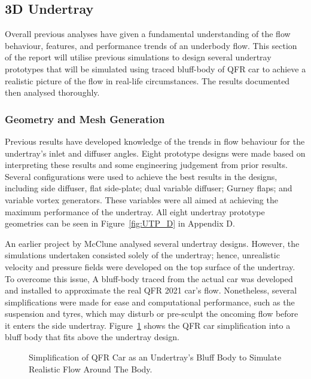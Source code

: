 
\subsection{3D Undertray}
Overall previous analyses have given a fundamental understanding of the flow behaviour, features, and performance trends of an underbody flow. This section of the report will utilise previous simulations to design several undertray prototypes that will be simulated using traced bluff-body of QFR car to achieve a realistic picture of the flow in real-life circumstances. The results documented then analysed thoroughly.

\subsubsection{Geometry and Mesh Generation}
\noindent Previous results have developed knowledge of the trends in flow behaviour for the undertray's inlet and diffuser angles. Eight prototype designs were made based on interpreting these results and some engineering judgement from prior results. Several configurations were used to achieve the best results in the designs, including side diffuser, flat side-plate; dual variable diffuser; Gurney flaps; and variable vortex generators. These variables were all aimed at achieving the maximum performance of the undertray. All eight undertray prototype geometries can be seen in Figure~\ref{fig:UTP_D} in Appendix D.



\noindent An earlier project by McClune \cite{McClune2018DesignCar} analysed several undertray designs. However, the simulations undertaken consisted solely of the undertray; hence, unrealistic velocity and pressure fields were developed on the top surface of the undertray. To overcome this issue, A bluff-body traced from the actual car was developed and installed to approximate the real QFR 2021 car's flow. Nonetheless, several simplifications were made for ease and computational performance, such as the suspension and tyres, which may disturb or pre-sculpt the oncoming flow before it enters the side undertray. Figure~\ref{fig:3D_UT_BB_SIMPLIFICATION} shows the QFR car simplification into a bluff body that fits above the undertray design.

\begin{figure}[!htb] 
    \centering
    \noindent{}
    \caption{Simplification of QFR Car as an Undertray's Bluff Body to Simulate Realistic Flow Around The Body.}
      \label{fig:3D_UT_BB_SIMPLIFICATION}
\end{figure}

